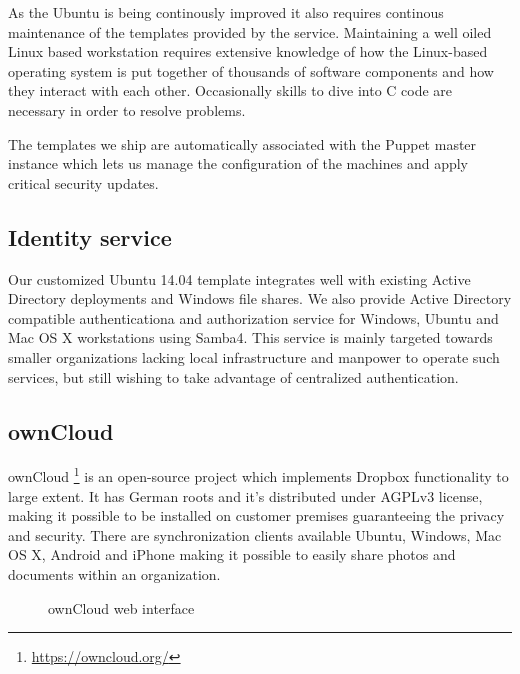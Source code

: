 \documentclass{article}
\begin{document}
As the Ubuntu is being continously improved it also requires
continous maintenance of the templates provided by the service.
Maintaining a well oiled Linux based workstation
requires extensive knowledge of
how the Linux-based operating system is put together of 
thousands of software components and how they interact with each other.
Occasionally skills to dive into C code are necessary
in order to resolve problems.

The templates we ship are automatically associated with
the Puppet master instance which lets us manage
the configuration of the machines and apply critical security updates.


\subsection{Identity service}

Our customized Ubuntu 14.04 template integrates
well with existing Active Directory deployments
and Windows file shares.
We also provide Active Directory compatible
authenticationa and authorization service
for Windows, Ubuntu and Mac OS X workstations using Samba4.
This service is mainly targeted towards
smaller organizations lacking local
infrastructure and manpower to operate such services,
but still wishing to take advantage of centralized
authentication.

\subsection{ownCloud}

ownCloud
\footnote{\url{https://owncloud.org/}}
is an open-source project which implements
Dropbox functionality to large extent.
It has German roots and it's distributed under AGPLv3 license,
making it possible to be installed on customer premises
guaranteeing the privacy and security.
There are synchronization clients available
Ubuntu, Windows, Mac OS X, Android and iPhone
making it possible to easily share photos and documents within
an organization.

\begin{figure}[!htb]
\centering
{}
\caption{ownCloud web interface}
\label{fig:digraph}
\end{figure}
\end{document}

